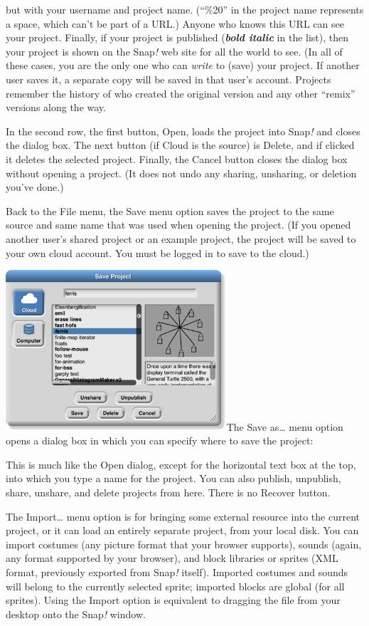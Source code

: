 but with your username and project name. (``\%20'' in the project name
represents a space, which can't be part of a URL.) Anyone who knows this
URL can see your project. Finally, if your project is published
(\emph{\textbf{bold italic}} in the list), then your project is shown on
the Snap\emph{!} web site for all the world to see. (In all of these
cases, you are the only one who can \emph{write} to (save) your project.
If another user saves it, a separate copy will be saved in that user's
account. Projects remember the history of who created the original
version and any other ``remix'' versions along the way.

In the second row, the first button, Open, loads the project into
Snap\emph{!} and closes the dialog box. The next button (if Cloud is the
source) is Delete, and if clicked it deletes the selected project.
Finally, the Cancel button closes the dialog box without opening a
project. (It does not undo any sharing, unsharing, or deletion you've
done.)

Back to the File menu, the Save menu option saves the project to the
same source and same name that was used when opening the project. (If
you opened another user's shared project or an example project, the
project will be saved to your own cloud account. You must be logged in
to save to the cloud.)

\includegraphics[width=3.23611in,height=2.34931in]{media/image998.png}The
Save as\ldots{} menu option opens a dialog box in which you can specify
where to save the project:

This is much like the Open dialog, except for the horizontal text box at
the top, into which you type a name for the project. You can also
publish, unpublish, share, unshare, and delete projects from here. There
is no Recover button.

The Import\ldots{} menu option is for bringing some external resource
into the current project, or it can load an entirely separate project,
from your local disk. You can import costumes (any picture format that
your browser supports), sounds (again, any format supported by your
browser), and block libraries or sprites (XML format, previously
exported from Snap\emph{!} itself). Imported costumes and sounds will
belong to the currently selected sprite; imported blocks are global (for
all sprites). Using the Import option is equivalent to dragging the file
from your desktop onto the Snap\emph{!} window.

